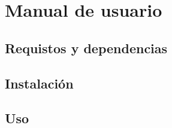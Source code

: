 \section{Manual de usuario}
\subsection{Requistos y dependencias}
\subsection{Instalaci\'on}
\subsection{Uso}